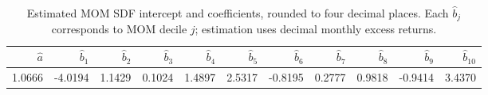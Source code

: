 \begin{table}[htbp]
  \centering
  \caption{Estimated MOM SDF intercept and coefficients, rounded to four
  decimal places. Each $\hat b_j$ corresponds to MOM decile $j$;
  estimation uses decimal monthly excess returns.}
  \label{tab:q2b-mom-sdf-parameters}
  \small
  \setlength{\tabcolsep}{3pt}
  \begin{tabular}{*{11}{r}}
    \toprule
    $\hat a$ & $\hat b_{1}$ & $\hat b_{2}$ & $\hat b_{3}$ & $\hat b_{4}$ & $\hat b_{5}$ & $\hat b_{6}$ & $\hat b_{7}$ & $\hat b_{8}$ & $\hat b_{9}$ & $\hat b_{10}$ \\
    \midrule
    1.0666 & -4.0194 & 1.1429 & 0.1024 & 1.4897 & 2.5317 & -0.8195 & 0.2777 & 0.9818 & -0.9414 & 3.4370 \\
    \bottomrule
  \end{tabular}
\end{table}
